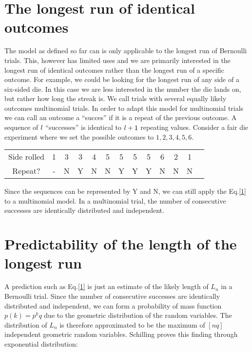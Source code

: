 \documentclass{article}
\begin{document}
\section{The longest run of identical outcomes}
The model as defined so far can is only applicable to the longest run of Bernoulli trials. This, however has limited uses and we are primarily interested in the longest run of identical outcomes rather than the longest run of a specific outcome. For example, we could be looking for the longest run of any side of a six-sided die. In this case we are less interested in the number the die lands on, but rather how long the streak is. We call trials with several equally likely outcomes multinomial trials. In order to adapt this model for multinomial trials we can call an outcome a ``succes'' if it is a repeat of the previous outcome. A sequence of $\mathnormal{l}$ ``successes'' is identical to $\mathnormal{l}+1$ repeating values. 
Consider a fair die experiment where we set the possible outcomes to $1,2,3,4,5,6$.

\hspace{15pt}

\begin{tabular}{c c c c c c c c c c c c c}
    Side rolled & 1 & 3 & 3 & 4 & 5 & 5 & 5 & 5 & 6 & 2 & 1\\
     Repeat? & - & N & Y & N & N & Y & Y & Y & N & N & N\\
\end{tabular}

\hspace{15pt}

Since the sequences can be represented by Y and N, we can still apply the Eq.\ref{1} to a multinomial model. 
In a multinomial trial, the number of consecutive successes are identically distributed and independent. 
\section{Predictability of the length of the longest run}
A prediction such as Eq.\ref{1} is just an estimate of the likely length of $L_n$ in a Bernoulli trial. Since the number of consecutive successes are identically distributed and independent, we can form a probability of mass function $p(k)=p^kq$ due to the geometric distribution of the random variables. The distribution of $L_n$ is therefore approximated to be the maximum of  $[nq]$ independent geometric random variables. Schilling proves this finding through exponential distribution:
\end{document}
